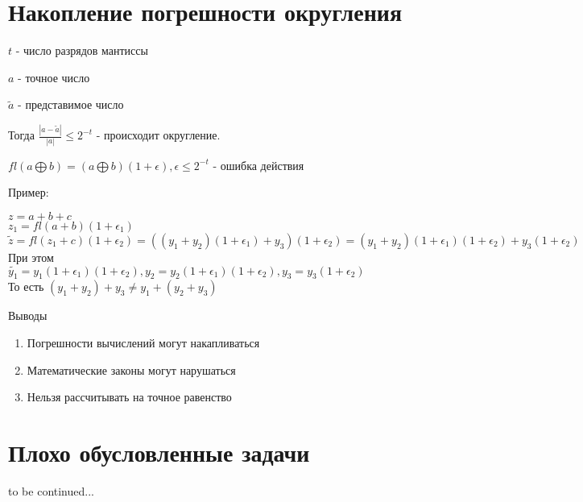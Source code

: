 \documentclass[a4paper,12pt]{report}
\begin{document}
\section{Накопление погрешности округления}

$t$ - число разрядов мантиссы

$a$ - точное число

$\tilde{a}$ - представимое число

Тогда $\frac{|a-\tilde{a}|}{|a|}\leqslant2^{-t}$ - происходит округление.

$fl(a \bigoplus b)=(a \bigoplus b)(1+\epsilon), \epsilon \leqslant 2^{-t}$ - ошибка действия

Пример:

$z=a+b+c$\\

$z_1=fl(a+b)(1+\epsilon_1)$\\

$\tilde{z}=fl(z_1+c)(1+\epsilon_2)=((y_1+y_2)(1+\epsilon_1)+y_3)(1+\epsilon_2)=(y_1+y_2)(1+\epsilon_1)(1+\epsilon_2)+y_3(1+\epsilon_2)$\\

При этом $\tilde{y_1}=y_1(1+\epsilon_1)(1+\epsilon_2), y_2=y_2(1+\epsilon_1)(1+\epsilon_2), y_3=y_3(1+\epsilon_2)$\\

То есть $(y_1+y_2)+y_3 \not = y_1+(y_2+y_3)$

Выводы
\begin{enumerate}
  \item Погрешности вычислений могут накапливаться
  \item Математические законы могут нарушаться
  \item Нельзя рассчитывать на точное равенство
\end{enumerate}

\section{Плохо обусловленные задачи}


to be continued...
\end{document}

